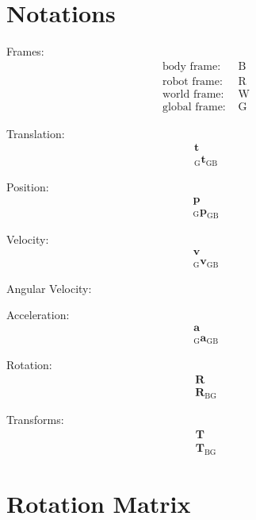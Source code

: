 \documentclass{article}
\renewcommand{\Vec}[1]{{\mathbf{#1}}}
\newcommand{\Mat}[1]{{\mathbf{#1}}}
\newcommand{\rot}{{\Mat{R}}}
\newcommand{\body}{{\text{B}}}
\newcommand{\robot}{{\text{R}}}
\newcommand{\world}{{\text{W}}}
\newcommand{\glob}{{\text{G}}}
\newcommand{\KineNotationP}[3]{{{#1}_{#2#3}}}
\newcommand{\KineNotationF}[4]{{{{}_{#4}} {#1}_{#2#3}}}
\newcommand{\trans}{{\Vec{t}}}
\newcommand{\Trans}[3]{{\KineNotationF{\trans}{#1}{#2}{#3}}}
\newcommand{\pos}{{\Vec{p}}}
\newcommand{\Pos}[3]{{\KineNotationF{\pos}{#1}{#2}{#3}}}
\newcommand{\vel}{{\Vec{v}}}
\newcommand{\Vel}[3]{{\KineNotationF{\vel}{#1}{#2}{#3}}}
\newcommand{\angvel}{{\mathbfsymbol{\omega}}}
\newcommand{\AngVel}[3]{{\KineNotationF{\angvel}{#1}{#2}{#3}}}
\newcommand{\acc}{{\Vec{a}}}
\newcommand{\Acc}[3]{{\KineNotationF{\acc}{#1}{#2}{#3}}}
\newcommand{\rot}{{\Mat{R}}}
\newcommand{\Rot}[2]{{\KineNotationP{\rot}{#1}{#2}}}
\newcommand{\tf}{{\Mat{T}}}
\newcommand{\Tf}[2]{{\KineNotationP{\tf}{#1}{#2}}}
\begin{document}
\tableofcontents
\newpage


\section{Notations}

Frames:
\begin{align}
  \text{body frame: } & \body \\
  \text{robot frame: } & \robot \\
  \text{world frame: } & \world \\
  \text{global frame: } & \glob
\end{align}

Translation:
\begin{align}
  \trans \\
  \Trans{\glob}{\body}{\glob}
\end{align}


Position:
\begin{align}
  \pos \\
  \Pos{\glob}{\body}{\glob}
\end{align}


Velocity:
\begin{align}
  \vel \\
  \Vel{\glob}{\body}{\glob}
\end{align}


Angular Velocity:


Acceleration:
\begin{align}
  \acc \\
  \Acc{\glob}{\body}{\glob}
\end{align}

Rotation:
\begin{align}
  \rot \\
  \Rot{\body}{\glob}
\end{align}


Transforms:
\begin{align}
  \tf \\
  \Tf{\body}{\glob}
\end{align}



\newpage
\section{Rotation Matrix}
\end{document}
